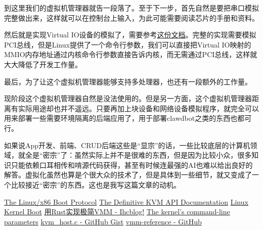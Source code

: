 \vfill\eject


到这里我们的虚拟机管理器就告一段落了。至于下一步，首先自然是要把串口模拟完整做出来，这样就可以在控制台上输入，为此可能需要阅读\sp 芯片的手册和资料。

然后就是实现\sp Virtual IO\sp 设备的模拟了，需要参考\href{https://docs.oasis-open.org/virtio/virtio/v1.0/virtio-v1.0.html}{这份文档}。完整的实现需要模拟\sp PCI\sp 总线，但是\sp Linux\sp 提供了一个命令行参数，我们可以直接把\sp Virtual IO\sp 映射的\sp MMIO\sp 内存地址通过内核命令行参数直接告诉内核，而无需通过\sp PCI\sp 总线，这样就大大降低了开发工作量。

最后，为了让这个虚拟机管理器能够支持多处理器，也还有一段额外的工作量。

现阶段这个虚拟机管理器自然是没法使用的。但是另一方面，这个虚拟机管理器距离有实际用途却也并不遥远。只要再加上块设备和网络设备模拟程序，就完全可以用来部署一些需要环境隔离的后端应用了，用于部署\sp clawdbot\sp 之类的东西也都可行。

如果说\sp App\sp 开发、前端、CRUD\sp 后端这些是“显宗”的话，一些比较底层的计算机领域，就全是“密宗”了：虽然实际上并不是很难的东西，但是因为比较小众，很多知识只能依赖口耳相传和啃源代码获得，甚至有时候连最强的\sp AI\sp 也难以给出良好的解答。虚拟化虽然也算是个很大众的技术了，但是具体到一些细节，就又变成了一个比较接近“密宗”的东西。这也是我写这篇文章的动机。


\bli
    \li \href{https://www.kernel.org/doc/html/v6.1/x86/boot.html}{The Linux/x86 Boot Protocol}
    \li \href{https://docs.kernel.org/virt/kvm/api.html}{The Definitive KVM API Documentation}
    \li \href{https://wdv4758h.github.io/notes/blog/linux-kernel-boot.html}{Linux Kernel Boot}
    \li \href{https://www.ihcblog.com/rust-mini-vmm-1/}{用\sp Rust\sp 实现极简\sp VMM - Ihcblog!}
    \li \href{https://docs.kernel.org/admin-guide/kernel-parameters.html}{The kernel’s command-line parameters}
    \li \href{https://gist.github.com/zserge/ae9098a75b2b83a1299d19b79b5fe488}{kvm\_host.c - GitHub Gist}
    \li \href{https://github.com/rust-vmm/vmm-reference/}{vmm-reference - GitHub}
\eli

\bye